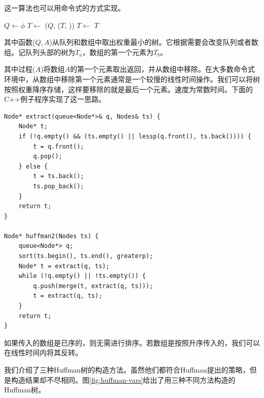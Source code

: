 \documentclass[b5paper]{ctexart}
\begin{document}
这一算法也可以用命令式的方式实现。

\begin{algorithmic}[1]
 
  \State $Q \gets \phi$
  \State $T \gets$ 
    \State {}($Q$, ($T$, ))
    \State $T \gets$ 
  \EndWhile
  \State \Return $T$
\EndFunction
\end{algorithmic}

其中函数($Q, A$)从队列和数组中取出权重最小的树。它根据需要会改变队列或者数组。记队列头部的树为$T_a$，数组的第一个元素为$T_b$。

\begin{algorithmic}[1]
    \State \Return {}
  \Else
    \State \Return {}
  \EndIf
\EndFunction
\end{algorithmic}

其中过程($A$)将数组$A$的第一个元素取出返回，并从数组中移除。在大多数命令式环境中，从数组中移除第一个元素通常是一个较慢的线性时间操作。我们可以将树按照权重降序存储，这样要移除的就是最后一个元素。速度为常数时间。下面的C++例子程序实现了这一思路。

\lstset{language=C++}
\begin{lstlisting}
Node* extract(queue<Node*>& q, Nodes& ts) {
    Node* t;
    if (!q.empty() && (ts.empty() || lessp(q.front(), ts.back()))) {
        t = q.front();
        q.pop();
    } else {
        t = ts.back();
        ts.pop_back();
    }
    return t;
}

Node* huffman2(Nodes ts) {
    queue<Node*> q;
    sort(ts.begin(), ts.end(), greaterp);
    Node* t = extract(q, ts);
    while (!q.empty() || !ts.empty()) {
        q.push(merge(t, extract(q, ts)));
        t = extract(q, ts);
    }
    return t;
}
\end{lstlisting}

如果传入的数组是已序的，则无需进行排序。若数组是按照升序传入的，我们可以在线性时间内将其反转。

我们介绍了三种Huffman树的构造方法。虽然他们都符合Huffman提出的策略，但是构造结果却不尽相同。图\ref{fig:huffman-vars}给出了用三种不同方法构造的Huffman树。
\end{document}
